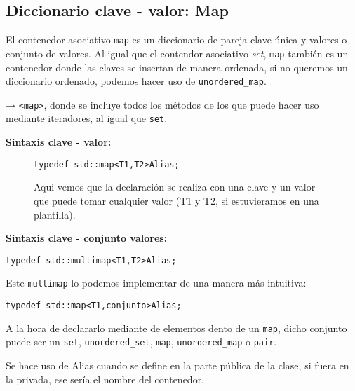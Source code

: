\subsection{Diccionario clave - valor: Map}
El contenedor asociativo \texttt{map} es un diccionario de pareja clave única y valores o conjunto de valores.
Al igual que el contendor asociativo \textit{set}, \texttt{map} también es un contenedor donde las claves se insertan de manera ordenada,
si no queremos un diccionario ordenado, podemos hacer uso de \texttt{unordered\_map}.\

 → \texttt{<map>}, donde se incluye todos los métodos de los que puede hacer uso mediante iteradores, al igual que \texttt{set}.

\textbf{\large{Sintaxis clave - valor:}}

\begin{figure}[h]
  \begin{center}
    \begin{lstlisting}[frame=single]
                  typedef std::map<T1,T2>Alias;
    \end{lstlisting}
  \end{center}
  Aqui vemos que la declaración se realiza con una clave y un valor que puede tomar cualquier 
  valor (T1 y T2, si estuvieramos en una plantilla).
\end{figure}

\textbf{\large{Sintaxis clave - conjunto valores:}}

\begin{center}
  \begin{lstlisting}[frame=single]
                typedef std::multimap<T1,T2>Alias;
  \end{lstlisting}
\end{center}


Este \texttt{multimap} lo podemos implementar de una manera más intuitiva:
\begin{center}
  \begin{lstlisting}[frame=single]
              typedef std::map<T1,conjunto>Alias;
  \end{lstlisting}
\end{center}

A la hora de declararlo mediante  de elementos dento de un \texttt{map}, dicho conjunto puede ser un \texttt{set}, \texttt{unordered\_set},
   \texttt{map}, \texttt{unordered\_map} o \texttt{pair}.

Se hace uso de Alias cuando se define en la parte pública de la clase, si fuera en la privada, ese sería el nombre
del contenedor.

